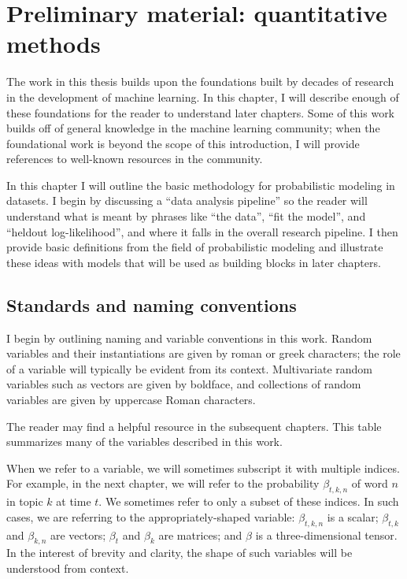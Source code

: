 \chapter{Preliminary material: quantitative methods}
\label{chapter:introductory_material}

The work in this thesis builds upon the foundations built by decades
of research in the development of machine learning.  In this chapter,
I will describe enough of these foundations for the reader to
understand later chapters. Some of this work builds off of general
knowledge in the machine learning community; when the foundational
work is beyond the scope of this introduction, I will provide
references to well-known resources in the community.

In this chapter I will outline the basic methodology for
probabilistic modeling in datasets.  I begin by discussing a ``data
analysis pipeline'' so the reader will understand what is meant by
phrases like ``the data'', ``fit the model'', and ``heldout
log-likelihood'', and where it falls in the overall research pipeline.
I then provide basic definitions from the field of probabilistic
modeling and illustrate these ideas with models that will be used as
building blocks in later chapters.

\section{Standards and naming conventions}
I begin by outlining naming and variable conventions in this work.
Random variables and their instantiations are given by roman or greek
characters; the role of a variable will typically be evident from its
context.  Multivariate random variables such as vectors are given by
boldface, and collections of random variables are given by uppercase
Roman characters.

The reader may find  a helpful resource in the
subsequent chapters.  This table summarizes many of the variables
described in this work.

When we refer to a variable, we will sometimes subscript it with
multiple indices.  For example, in the next chapter, we will refer to
the probability $\beta_{t,k,n}$ of word $n$ in topic $k$ at time
$t$. We sometimes refer to only a subset of these indices. In such
cases, we are referring to the appropriately-shaped variable:
$\beta_{t,k,n}$ is a scalar; $\beta_{t,k}$ and $\beta_{k,n}$ are
vectors; $\beta_t$ and $\beta_k$ are matrices; and
$\beta$ is a three-dimensional tensor.  In the interest of brevity and
clarity, the shape of such variables will be understood from context.

